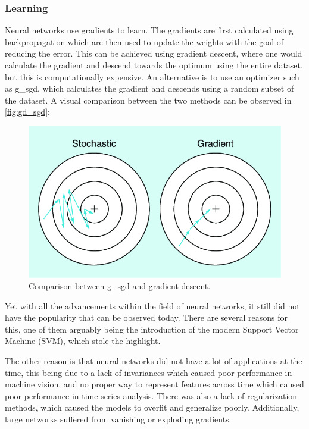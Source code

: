\subsubsection{Learning}
Neural networks use gradients to learn. The gradients are first calculated using backpropagation which are then used to update the weights with the goal of reducing the error. This can be achieved using gradient descent, where one would calculate the gradient and descend towards the optimum using the entire dataset, but this is computationally expensive. An alternative is to use an optimizer such as \gls*{g_sgd}\cite{sgd}, which calculates the gradient and descends using a random subset of the dataset. A visual comparison between the two methods can be observed in \autoref{fig:gd_sgd}:
\begin{figure}[H]
    \centering
    \includegraphics[width=0.8\linewidth]{resources/related_works/gradient_descent}
    \caption{Comparison between \gls*{g_sgd} and gradient descent.}
    \label{fig:gd_sgd}
\end{figure}
\par
Yet with all the advancements within the field of neural networks, it still did not have the popularity that can be observed today. There are several reasons for this, one of them arguably being the introduction of the modern Support Vector Machine (SVM)\cite{svm}, which stole the highlight.
\par
The other reason is that neural networks did not have a lot of applications at the time, this being due to a lack of invariances which caused poor performance in machine vision, and no proper way to represent features across time which caused poor performance in time-series analysis. There was also a lack of regularization methods, which caused the models to overfit and generalize poorly. Additionally, large networks suffered from vanishing or exploding gradients.
\par
